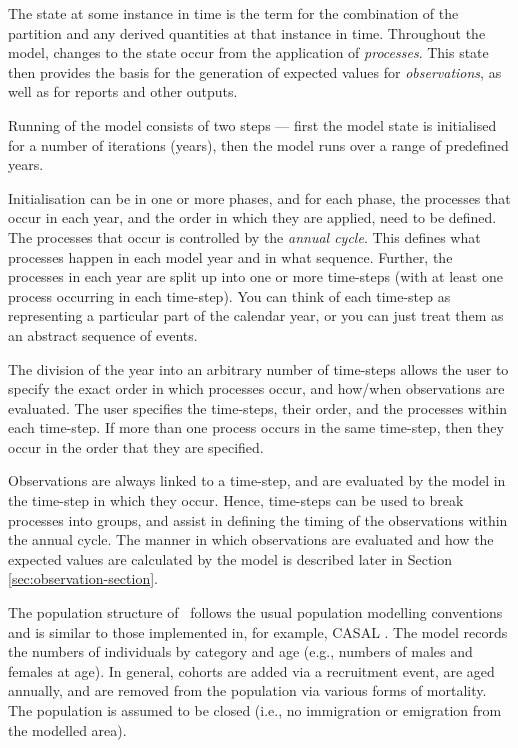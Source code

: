 The state at some instance in time is the term for the combination of the partition and any derived quantities at that instance in time. Throughout the model, changes to the state occur from the application of \emph{processes}. This state then provides the basis for the generation of expected values for \emph{observations}, as well as for reports and other outputs.

Running of the model consists of two steps --- first the model state is initialised for a number of iterations (years), then the model runs over a range of predefined years. 

Initialisation can be in one or more phases, and for each phase, the processes that occur in each year, and the order in which they are applied, need to be defined. The processes that occur is controlled by the \emph{annual cycle}. This defines what processes happen in each model year and in what sequence. Further, the processes in each year are split up into one or more time-steps (with at least one process occurring in each time-step). You can think of each time-step as representing a particular part of the calendar year, or you can just treat them as an abstract sequence of events.

The division of the year into an arbitrary number of time-steps allows the user to specify the exact order in which processes occur, and how/when observations are evaluated. The user specifies the time-steps, their order, and the processes within each time-step. If more than one process occurs in the same time-step, then they occur in the order that they are specified. 

Observations are always linked to a time-step, and are evaluated by the model in the time-step in which they occur. Hence, time-steps can be used to break processes into groups, and assist in defining the timing of the observations within the annual cycle. The manner in which observations are evaluated and how the expected values are calculated by the model is described later in Section \ref{sec:observation-section}.

The population structure of \CNAME\ follows the usual population modelling conventions and is similar to those implemented in, for example, CASAL \citep{1388}. The model records the numbers of individuals by category and age (e.g., numbers of males and females at age). In general, cohorts are added via a recruitment event, are aged annually, and are removed from the population via various forms of mortality. The population is assumed to be closed (i.e., no immigration or emigration from the modelled area).

